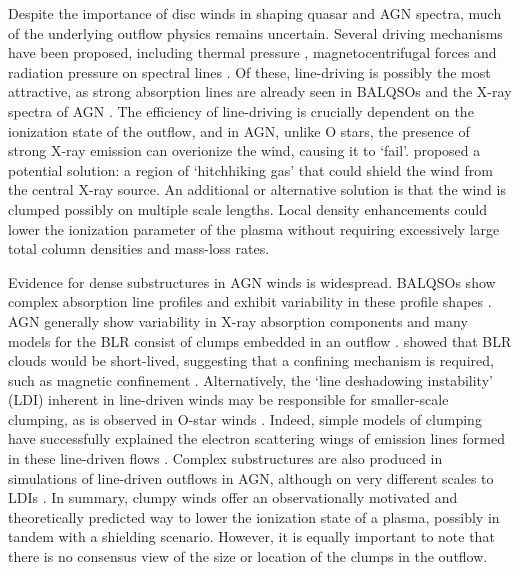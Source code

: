 \documentclass[useAMS,usenatbib]{mn2e_x}
\begin{document}
Despite the importance of disc winds in shaping quasar and AGN spectra,  
much of the underlying outflow physics remains uncertain. 
Several driving mechanisms have been proposed, including
thermal pressure \citep{weymann1982, begelman1991}, magnetocentrifugal forces 
\citep{blandfordpayne,pelletier_pudritz} and 
radiation pressure on spectral lines \citep[`line-driving';][]{lucysolomon1970,shlosman1985,MCGV95}.
Of these, line-driving is possibly the most attractive, as
strong absorption lines are already seen in BALQSOs and the X-ray spectra of AGN 
\citep{reeves2003,poundsreeves2009,tombesi2010a}.
The efficiency of line-driving is crucially dependent on the ionization state 
of the outflow, and in AGN, unlike O stars, 
the presence of strong X-ray emission can overionize the wind, 
causing it to `fail'.
\cite{MCGV95} proposed a potential solution: 
a region of `hitchhiking gas' that could shield the wind from the central X-ray source. 
An additional or alternative solution is that the wind is clumped 
\citep[e.g.][]{junk1983,weymann1985,hamann2013}
possibly on multiple scale lengths. Local density enhancements could lower the 
ionization parameter of the plasma 
without requiring excessively large total column densities 
and mass-loss rates.

Evidence for dense substructures in AGN winds is widespread.
BALQSOs show complex absorption line profiles \citep{ganguly2006, simonhamann2010}
and exhibit variability in these profile shapes \citep{capellupo2011,capellupo2012,capellupo2014}.
AGN generally show variability in X-ray absorption components \citep[e.g.][]{risaliti2002}
and many models for the BLR consist of clumps embedded in an outflow 
\citep{krolik1981, emmering1992, dekool1995, cassidyraine1996}.
\cite{krolik1981} showed that BLR clouds would be short-lived, suggesting 
that a confining mechanism is required, such as
magnetic confinement \citep[e.g.][]{dekool1995}. Alternatively,
the `line deshadowing instability' (LDI) inherent in line-driven winds
\citep{lucysolomon1970,macgregor1979,carlberg1980,owockirybicki1984}
may be responsible for smaller-scale clumping, as is observed in O-star winds
\citep[][and references therein]{fullerton2011}.
Indeed, simple models of clumping have successfully explained the electron scattering 
wings of emission lines formed in these line-driven flows 
\citep{hillier1991eswingsmodel}.
Complex substructures are also produced in simulations of line-driven 
outflows in AGN, although on very different scales to LDIs 
\citep{PSK2000,PK04,progakurosawa2010,proga2014}.  
In summary, clumpy winds offer an observationally motivated and theoretically 
predicted way to lower the ionization state of a plasma, possibly in tandem
with a shielding scenario. However, it is equally important to note that there 
is no consensus view of the size or location of the clumps in the outflow.
\end{document}
